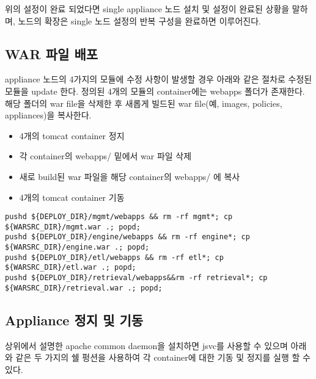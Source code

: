 \documentclass[11pt
  , a4paper
  , article
  , oneside
]{memoir}
\begin{document}
위의 설정이 완료 되었다면 single appliance 노드 설치 및 설정이 완료된 상황을 말하며, 노드의 확장은 single 노드 설정의 반복 구성을 완료하면 이루어진다.

\subsection {WAR 파일 배포}
appliance 노드의 4가지의 모듈에 수정 사항이 발생할 경우 아래와 같은 절차로 수정된 모듈을 update 한다. 정의된 4개의 모듈의 container에는 webapps 폴더가 존재한다. 해당 폴더의 war file을 삭제한 후 새롭게 빌드된 war file(예, images, policies, appliances)을 복사한다.
 \begin{itemize}
 	\item 4개의 tomcat container 정지
 	\item 각 container의 webapps/ 밑에서 war 파일 삭제
 	\item 새로 build된 war 파일을 해당 container의 webapps/ 에 복사
 	\item 4개의 tomcat container 기동
 \end{itemize}

\begin{lstlisting}[style=termstyle]
pushd ${DEPLOY_DIR}/mgmt/webapps && rm -rf mgmt*; cp ${WARSRC_DIR}/mgmt.war .; popd; 
pushd ${DEPLOY_DIR}/engine/webapps && rm -rf engine*; cp ${WARSRC_DIR}/engine.war .; popd; 
pushd ${DEPLOY_DIR}/etl/webapps && rm -rf etl*; cp ${WARSRC_DIR}/etl.war .; popd; 
pushd ${DEPLOY_DIR}/retrieval/webapps&&rm -rf retrieval*; cp ${WARSRC_DIR}/retrieval.war .; popd;
\end{lstlisting}

\subsection {Appliance 정지 및 기동}
상위에서 설명한 apache common daemon을 설치하면 jsvc를 사용할 수 있으며 아래와 같은 두 가지의 쉘 펑션을 사용하여 각 container에 대한 기동 및 정지를 실행 할 수 있다. 
\end{document}
